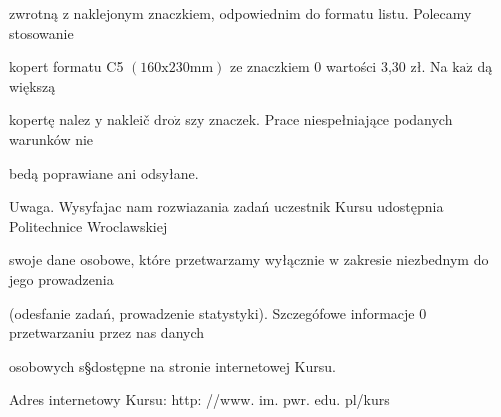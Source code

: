 \documentclass[a4paper,12pt]{article}
\begin{document}
zwrotną $\mathrm{z}$ naklejonym znaczkiem, odpowiednim do formatu listu. Polecamy stosowanie

kopert formatu C5 $(160\mathrm{x}230\mathrm{m}\mathrm{m})$ ze znaczkiem $0$ wartości 3,30 zł. Na $\mathrm{k}\mathrm{a}\dot{\mathrm{z}}$ dą większą

kopertę nalez $\mathrm{y}$ nakleič $\mathrm{d}\mathrm{r}\mathrm{o}\dot{\mathrm{z}}$ szy znaczek. Prace niespełniające podanych warunków nie

bedą poprawiane ani odsyłane.

Uwaga. Wysyfajac nam rozwiazania zadań uczestnik Kursu udostępnia Politechnice Wroclawskiej

swoje dane osobowe, które przetwarzamy wyłącznie $\mathrm{w}$ zakresie niezbednym do jego prowadzenia

(odesfanie zadań, prowadzenie statystyki). Szczegófowe informacje $0$ przetwarzaniu przez nas danych

osobowych s\S dostępne na stronie internetowej Kursu.

Adres internetowy Kursu: http: //www. im. pwr. edu. pl/kurs
\end{document}
